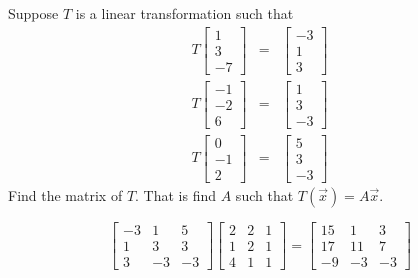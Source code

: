 \documentclass{ximera}
\begin{document}
\begin{problem}\label{prb:10.95} Suppose $T$ is a linear transformation such that
\begin{eqnarray*}
T\left[
\begin{array}{r}
1 \\
3 \\
-7
\end{array}
\right] &=&\left[
\begin{array}{r}
-3 \\
1 \\
3
\end{array}
\right] \\
T\left[
\begin{array}{r}
-1 \\
-2 \\
6
\end{array}
\right] &=&\left[
\begin{array}{r}
1 \\
3 \\
-3
\end{array}
\right] \\
T\left[
\begin{array}{r}
0 \\
-1 \\
2
\end{array}
\right] &=&\left[
\begin{array}{r}
5 \\
3 \\
-3
\end{array}
\right]
\end{eqnarray*}
Find the matrix of $T$. That is find $A$ such that $T(\vec{x})=A\vec{x}$. \vspace{1mm}\vspace{1mm}
\begin{hint}
\[
\left[
\begin{array}{rrr}
-3 & 1 & 5 \\
1 & 3 & 3 \\
3 & -3 & -3
\end{array}
\right] \left[
\begin{array}{ccc}
2 & 2 & 1 \\
1 & 2 & 1 \\
4 & 1 & 1
\end{array}
\right] = \left[
\begin{array}{rrr}
15 & 1 & 3 \\
17 & 11 & 7 \\
-9 & -3 & -3
\end{array}
\right]
\]
\end{hint}
\end{problem}
\end{document}
